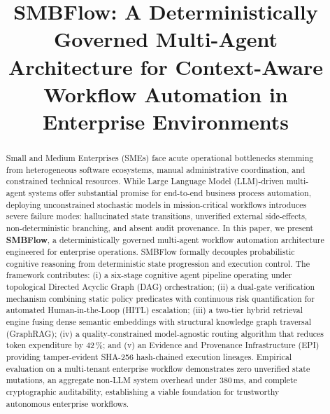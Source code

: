 \documentclass[conference]{IEEEtran}
\begin{document}
\title{SMBFlow: A Deterministically Governed Multi-Agent Architecture for Context-Aware Workflow Automation in Enterprise Environments}

\author{
}

\maketitle

\begin{abstract}
Small and Medium Enterprises (SMEs) face acute operational bottlenecks stemming from heterogeneous software ecosystems, manual administrative coordination, and constrained technical resources. While Large Language Model (LLM)-driven multi-agent systems offer substantial promise for end-to-end business process automation, deploying unconstrained stochastic models in mission-critical workflows introduces severe failure modes: hallucinated state transitions, unverified external side-effects, non-deterministic branching, and absent audit provenance. In this paper, we present \textbf{SMBFlow}, a deterministically governed multi-agent workflow automation architecture engineered for enterprise operations. SMBFlow formally decouples probabilistic cognitive reasoning from deterministic state progression and execution control. The framework contributes: (i) a six-stage cognitive agent pipeline operating under topological Directed Acyclic Graph (DAG) orchestration; (ii) a dual-gate verification mechanism combining static policy predicates with continuous risk quantification for automated Human-in-the-Loop (HITL) escalation; (iii) a two-tier hybrid retrieval engine fusing dense semantic embeddings with structural knowledge graph traversal (GraphRAG); (iv) a quality-constrained model-agnostic routing algorithm that reduces token expenditure by 42\,\%; and (v) an Evidence and Provenance Infrastructure (EPI) providing tamper-evident SHA-256 hash-chained execution lineages. Empirical evaluation on a multi-tenant enterprise workflow demonstrates zero unverified state mutations, an aggregate non-LLM system overhead under 380\,ms, and complete cryptographic auditability, establishing a viable foundation for trustworthy autonomous enterprise workflows.
\end{abstract}
\end{document}
